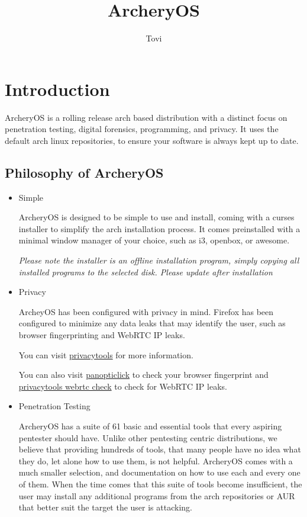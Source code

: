 \documentclass{article}
\author{Tovi}
\title{ArcheryOS}
\begin{document}
\maketitle

\tableofcontents

\pagebreak

\section{Introduction}
ArcheryOS is a rolling release arch based distribution with a distinct focus on penetration testing, digital forensics, programming, and privacy. It uses the default arch linux repositories, to ensure your software is always kept up to date.
\subsection{Philosophy of ArcheryOS}
\begin{itemize}
	\item Simple

		ArcheryOS is designed to be simple to use and install, coming with a curses installer to simplify the arch installation process. It comes preinstalled with a minimal window manager of your choice, such as i3, openbox, or awesome.

		\emph{Please note the installer is an offline installation program, simply copying all installed programs to the selected disk.  Please update after installation}
	
	\item Privacy

		ArcheyOS has been configured with privacy in mind. Firefox has been configured to minimize any data leaks that may identify the user, such as browser fingerprinting and WebRTC IP leaks. 
		
		You can visit \href{https://www.privacytools.io/}{privacytools} for more information.

		You can also visit \href{https://panopticlick.eff.org/}{panopticlick} to check your browser fingerprint and \href{https://www.privacytools.io/webrtc.html}{privacytools webrtc check} to check for WebRTC IP leaks.
	
	\item Penetration Testing

		ArcheryOS has a suite of 61 basic and essential tools that every aspiring pentester should have. Unlike other pentesting centric distributions, we believe that providing hundreds of tools, that many people have no idea what they do, let alone how to use them, is not helpful. ArcheryOS comes with a much smaller selection, and documentation on how to use each and every one of them. When the time comes that this suite of tools become insufficient, the user may install any additional programs from the arch repositories or AUR that better suit the target the user is attacking.
\end{itemize}
\end{document}
